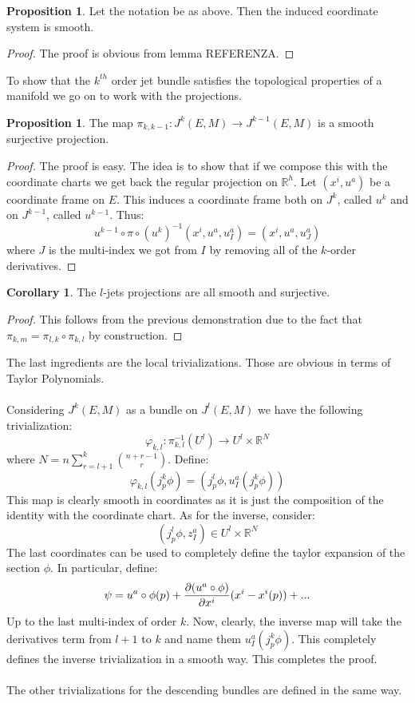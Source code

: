 \documentclass[12pt,a4paper]{report}
\theoremstyle{definition}
\theoremstyle{Theorem}
\newtheorem{Prop}[Def]{Proposition}
\theoremstyle{definition}
\theoremstyle{definition}
\newtheorem{Cor}[Def]{Corollary}
\begin{document}
	\begin{Prop}
		Let the notation be as above. Then the induced coordinate system is smooth.
	\end{Prop}
	\begin{proof}
		The proof is obvious from lemma REFERENZA.
	\end{proof}
	To show that the $k^{th}$ order jet bundle satisfies the topological properties of a manifold we go on to work with the projections.
	\begin{Prop}
		The map $\pi_{k,k-1}:J^k(E,M)\longrightarrow J^{k-1}(E,M)$ is a smooth surjective projection.
	\end{Prop}
	\begin{proof}
		The proof is easy. The idea is to show that if we compose this with the coordinate charts we get back the regular projection on $\mathbb{R}^h$.
		Let $(x^i,u^a)$ be a coordinate frame on $E$. This induces a coordinate frame both on $J^k$, called $u^k$ and on $J^{k-1}$, called $u^{k-1}$. Thus:
		$$u^{k-1}\circ \pi\circ (u^k)^{-1}(x^i,u^a,u^a_I)=(x^i,u^a,u^a_J)$$
		where $J$ is the multi-index we got from $I$ by removing all of the $k$-order derivatives.
	\end{proof}
	\begin{Cor}
		The $l$-jets projections are all smooth and surjective.
	\end{Cor}
	\begin{proof}
		This follows from the previous demonstration due to the fact that $\pi_{k,m}=\pi_{l,k}\circ \pi_{k,l}$ by construction.
	\end{proof}
	The last ingredients are the local trivializations. Those are obvious in terms of Taylor Polynomials.\\
	\\
	Considering $J^k(E,M)$ as a bundle on $J^{l}(E,M)$ we have the following trivialization:
	$$\varphi_{k,l}:\pi^{-1}_{k,l}(U^{l})\longrightarrow U^{l}\times\mathbb{R}^{N}$$
	where $N=n\sum_{r=l+1}^{k}{n+r-1\choose r}$. Define:
	$$\varphi_{k,l}(j^k_p\phi)=(j^l_p\phi,u^a_I(j^k_p\phi))$$
	This map is clearly smooth in coordinates as it is just the composition of the identity with the coordinate chart. As for the inverse, consider:
	$$(j^l_p\phi,z^a_I)\in U^{l}\times\mathbb{R}^{N}$$
	The last coordinates can be used to completely define the taylor expansion of the section $\phi$. In particular, define:
	$$\psi=u^a\circ \phi(p)+{\partial (u^a\circ \phi)\over \partial x^i}(x^i-x^i(p))+...$$
	Up to the last multi-index of order $k$. Now, clearly, the inverse map will take the derivatives term from $l+1$ to $k$ and name them $u^a_I(j^k_p\phi)$. This completely defines the inverse trivialization in a smooth way. This completes the proof.\\
	\\
	The other trivializations for the descending bundles are defined in the same way.
\end{document}
